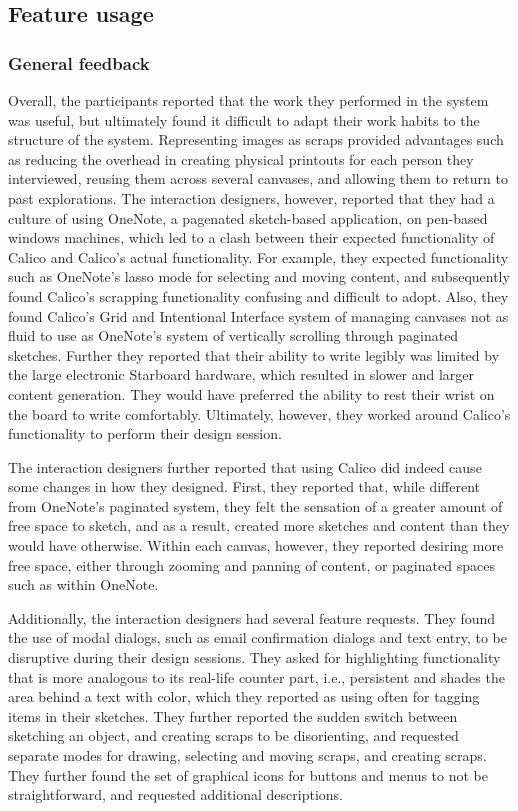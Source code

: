 \subsection{Feature usage}

\subsubsection{General feedback}

Overall, the participants reported that the work they performed in the system was useful, but ultimately found it difficult to adapt their work habits to the structure of the system. Representing images as scraps provided advantages such as reducing the overhead in creating physical printouts for each person they interviewed, reusing them across several canvases, and allowing them to return to past explorations. The interaction designers, however, reported that they had a culture of using OneNote, a pagenated sketch-based application, on pen-based windows machines, which led to a clash between their expected functionality of Calico and Calico's actual functionality. For example, they expected functionality such as OneNote's lasso mode for selecting and moving content, and subsequently found Calico's scrapping functionality confusing and difficult to adopt. Also, they found Calico's Grid and Intentional Interface system of managing canvases not as fluid to use as OneNote's system of vertically scrolling through paginated sketches. Further they reported that their ability to write legibly was limited by the large electronic Starboard hardware, which resulted in slower and larger content generation. They would have preferred the ability to rest their wrist on the board to write comfortably. Ultimately, however, they worked around Calico's functionality to perform their design session.

The interaction designers further reported that using Calico did indeed cause some changes in how they designed. First, they reported that, while different from OneNote's paginated system, they felt the sensation of a greater amount of free space to sketch, and as a result, created more sketches and content than they would have otherwise. Within each canvas, however, they reported desiring more free space, either through zooming and panning of content, or paginated spaces such as within OneNote. 

Additionally, the interaction designers had several feature requests. They found the use of modal dialogs, such as email confirmation dialogs and text entry, to be disruptive during their design sessions. They asked for highlighting functionality that is more analogous to its real-life counter part, i.e., persistent and shades the area behind a text with color, which they reported as using often for tagging items in their sketches. They further reported the sudden switch between sketching an object, and creating scraps to be disorienting, and requested separate modes for drawing, selecting and moving scraps, and creating scraps. They further found the set of graphical icons for buttons and menus to not be straightforward, and requested additional descriptions.

